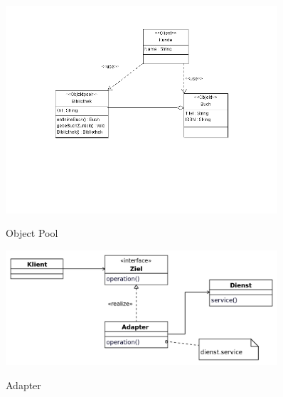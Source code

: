 \begin{figure}[htb]
    \centering
    \begin{minipage}[t]{0.45\linewidth}
		\centering
		\includegraphics[width=0.9\textwidth]{images/object_pool}
		\label{fig:object_pool}
		\caption{Object Pool}
	\end{minipage}%
	\hfill
    \begin{minipage}[t]{0.45\linewidth}
		\centering
		\includegraphics[width=0.9\textwidth]{images/adapter}
		\label{fig:adapter}
		\caption{Adapter}
	\end{minipage}
\end{figure}


